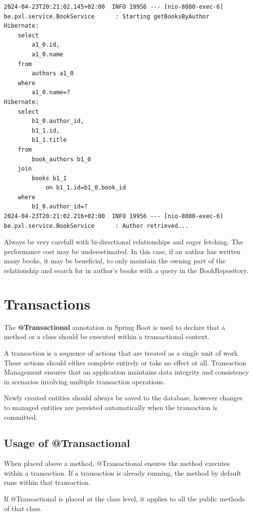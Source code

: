\begin{verbatim}
2024-04-23T20:21:02.145+02:00  INFO 19956 --- [nio-8080-exec-6]
be.pxl.service.BookService      : Starting getBooksByAuthor
Hibernate: 
    select
        a1_0.id,
        a1_0.name 
    from
        authors a1_0 
    where
        a1_0.name=?
Hibernate: 
    select
        b1_0.author_id,
        b1_1.id,
        b1_1.title 
    from
        book_authors b1_0 
    join
        books b1_1 
            on b1_1.id=b1_0.book_id 
    where
        b1_0.author_id=?
2024-04-23T20:21:02.216+02:00  INFO 19956 --- [nio-8080-exec-6]
be.pxl.service.BookService      : Author retrieved...
\end{verbatim}

Always be very carefull with bi-directional relationships and eager fetching. The performance cost may be underestimated. In this case, if an author has written many books, it may be beneficial, to only maintain the owning part of the relationship and search for in author's books with a query in the BookRepository.

\section{Transactions}

The \textbf{@Transactional} annotation in Spring Boot is used to declare that a method or a class should be executed within a transactional context.

A transaction is a sequence of actions that are treated as a single unit of work. These actions should either complete entirely or take no effect at all.
Transaction Management ensures that an application maintains data integrity and consistency in scenarios involving multiple transaction operations.

Newly created entities should always be saved to the database, however changes to managed entities are persisted automatically when the transaction is committed.

\subsection{Usage of @Transactional}

When placed above a method, @Transactional ensures the method executes within a transaction. If a transaction is already running, the method by default runs within that transaction.

If @Transactional is placed at the class level, it applies to all the public methods of that class.


